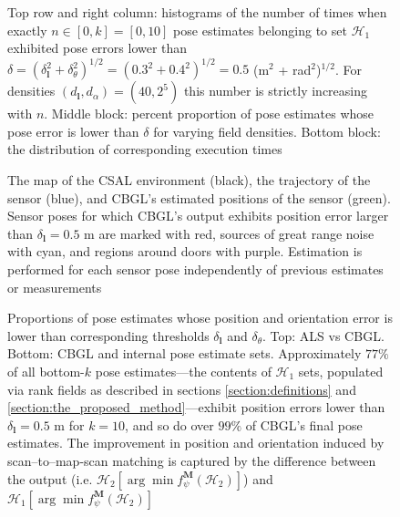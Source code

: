 \begin{figure}
  
  \caption{\small Top row and right column: histograms of the number of times
           when exactly $n \in [0,k] = [0,10]$ pose estimates belonging to set
           $\mathcal{H}_1$ exhibited pose errors lower than $\delta =
           (\delta_{\bm{l}}^2 + \delta_{\theta}^2)^{1/2} =  (0.3^2 +
           0.4^2)^{1/2} = 0.5$ (m$^2$ + rad$^2$)$^{1/2}$. For densities
           $(d_{\bm{l}},d_{\alpha}) = (40, 2^5)$ this number is strictly
           increasing with $n$. Middle block: percent proportion of pose
           estimates whose pose error is lower than $\delta$ for varying field
           densities. Bottom block: the distribution of corresponding execution
           times}
  \label{fig:a:determine_40_32}
\end{figure}


\begin{figure}
  
  \caption{\small The map of the CSAL environment (black), the trajectory of
           the sensor (blue), and CBGL's estimated positions of the sensor
           (green). Sensor poses for which CBGL's output exhibits position error
           larger than $\delta_{\bm{l}} = 0.5$ m are marked with red, sources
           of great range noise with cyan, and regions around doors with
           purple. Estimation is performed for each sensor pose independently
           of previous estimates or measurements}
  \label{fig:a:map_and_trajectory}
\end{figure}

\begin{figure}
  
  \vspace{0.1cm}
  \caption{\small Proportions of pose estimates whose position and orientation
           error is lower than corresponding thresholds $\delta_{\bm{l}}$ and
           $\delta_{\theta}$. Top: ALS vs CBGL. Bottom: CBGL and internal pose
           estimate sets.  Approximately $77\%$ of all bottom-$k$ pose
           estimates---the contents of $\mathcal{H}_1$ sets, populated via rank
           fields as described in sections \ref{section:definitions} and
           \ref{section:the_proposed_method}---exhibit position errors lower
           than $\delta_{\bm{l}} = 0.5$ m for $k=10$, and so do over $99\%$ of
           CBGL's final pose estimates. The improvement in position and
           orientation induced by scan--to--map-scan matching is captured by
           the difference between the output (i.e.  $\mathcal{H}_2[\arg \min
           f_{\psi}^{\bm{M}}(\mathcal{H}_2)]$) and $\mathcal{H}_1[\arg \min
           f_{\psi}^{\bm{M}}(\mathcal{H}_2)]$}
  \label{fig:a:awesomeness}
\end{figure}


